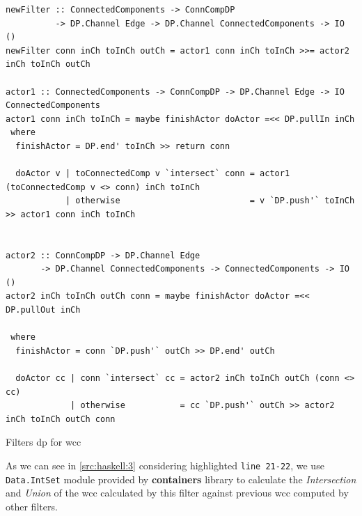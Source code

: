 \documentclass[preprint]{elsarticle}
\begin{document}
\begin{listing}[H]
\begin{verbatim}
newFilter :: ConnectedComponents -> ConnCompDP 
          -> DP.Channel Edge -> DP.Channel ConnectedComponents -> IO ()
newFilter conn inCh toInCh outCh = actor1 conn inCh toInCh >>= actor2 inCh toInCh outCh

actor1 :: ConnectedComponents -> ConnCompDP -> DP.Channel Edge -> IO ConnectedComponents
actor1 conn inCh toInCh = maybe finishActor doActor =<< DP.pullIn inCh
 where
  finishActor = DP.end' toInCh >> return conn

  doActor v | toConnectedComp v `intersect` conn = actor1 (toConnectedComp v <> conn) inCh toInCh
            | otherwise                          = v `DP.push'` toInCh >> actor1 conn inCh toInCh


actor2 :: ConnCompDP -> DP.Channel Edge 
       -> DP.Channel ConnectedComponents -> ConnectedComponents -> IO ()
actor2 inCh toInCh outCh conn = maybe finishActor doActor =<< DP.pullOut inCh

 where
  finishActor = conn `DP.push'` outCh >> DP.end' outCh

  doActor cc | conn `intersect` cc = actor2 inCh toInCh outCh (conn <> cc)
             | otherwise           = cc `DP.push'` outCh >> actor2 inCh toInCh outCh conn
\end{verbatim}
\caption{Filters \acrshort{dp} for \acrshort{wcc}}
\label{src:haskell:3}
\end{listing}

As we can see in \autoref{src:haskell:3} considering highlighted \texttt{line 21-22}, we use \texttt{Data.IntSet} module provided by \textbf{containers} \cite{containers} library to calculate the \textit{Intersection} and \textit{Union} of the \acrshort{wcc} calculated by this filter against  previous \acrshort{wcc} computed by other filters.\label{not:optimal}

\fi
\end{document}
